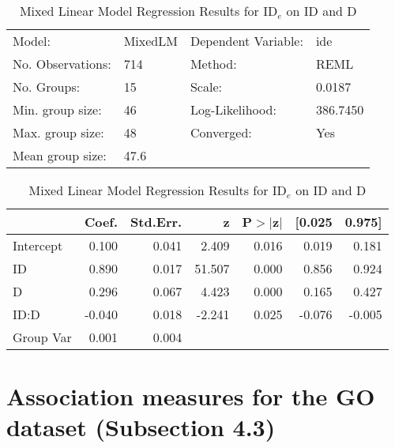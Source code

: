 \documentclass{article}
\begin{document}
	
	\begin{table}
		\caption{Mixed Linear Model Regression Results for ID$_e$ on ID and D}
		\label{tab:fit_jgp_ide_id_D}
		\begin{center}
			\begin{tabular}{llll}
				\hline
				Model:            & MixedLM & Dependent Variable: & ide       \\
				No. Observations: & 714     & Method:             & REML      \\
				No. Groups:       & 15      & Scale:              & 0.0187    \\
				Min. group size:  & 46      & Log-Likelihood:     & 386.7450  \\
				Max. group size:  & 48      & Converged:          & Yes       \\
				Mean group size:  & 47.6    &                     &           \\
				\hline
				\end{tabular}
				\end{center}
				
				\begin{center}
				\begin{tabular}{lrrrrrr}
				\hline
						  &  Coef. & Std.Err. &      z & P$> |$z$|$ & [0.025 & 0.975]  \\
				\hline
				Intercept &  0.100 &    0.041 &  2.409 &       0.016 &  0.019 &  0.181  \\
				ID        &  0.890 &    0.017 & 51.507 &       0.000 &  0.856 &  0.924  \\
				D         &  0.296 &    0.067 &  4.423 &       0.000 &  0.165 &  0.427  \\
				ID:D      & -0.040 &    0.018 & -2.241 &       0.025 & -0.076 & -0.005  \\
				Group Var &  0.001 &    0.004 &        &             &        &         \\
				\hline
				\end{tabular}
				\end{center}
				\end{table}
				
			


\section{Association measures for the GO dataset (Subsection 4.3)}
\end{document}
